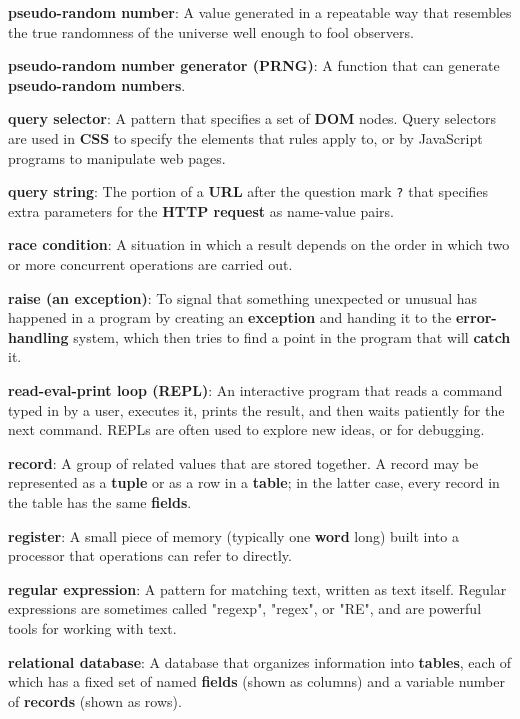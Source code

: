 \documentclass[krantzl]{krantz}
\newcommand{\glosskey}[1]{\textbf{#1}}
\begin{document}
\noindent \textbf{\glosskey{pseudo-random number}}: 
A value generated in a repeatable way that resembles the true randomness of the universe well enough to fool observers.


\noindent \textbf{\glosskey{pseudo-random number generator} (PRNG)}: 
A function that can generate \glosskey{pseudo-random numbers}.


\noindent \textbf{\glosskey{query selector}}: 
A pattern that specifies a set of \glosskey{DOM} nodes.  Query selectors are used in \glosskey{CSS} to specify the elements that rules apply to, or by JavaScript programs to manipulate web pages.


\noindent \textbf{\glosskey{query string}}: 
The portion of a \glosskey{URL} after the question mark \texttt{?} that specifies extra parameters for the \glosskey{HTTP request} as name-value pairs.


\noindent \textbf{\glosskey{race condition}}: 
A situation in which a result depends on the order in which two or more concurrent operations are carried out.


\noindent \textbf{\glosskey{raise (an exception)}}: 
To signal that something unexpected or unusual has happened in a program by creating an \glosskey{exception} and handing it to the \glosskey{error-handling} system, which then tries to find a point in the program that will \glosskey{catch} it.


\noindent \textbf{\glosskey{read-eval-print loop} (REPL)}: 
An interactive program that reads a command typed in by a user, executes it, prints the result, and then waits patiently for the next command. REPLs are often used to explore new ideas, or for debugging.


\noindent \textbf{\glosskey{record}}: 
A group of related values that are stored together. A record may be represented as a \glosskey{tuple} or as a row in a \glosskey{table}; in the latter case, every record in the table has the same \glosskey{fields}.


\noindent \textbf{\glosskey{register}}: 
A small piece of memory (typically one \glosskey{word} long) built into a processor that operations can refer to directly.


\noindent \textbf{\glosskey{regular expression}}: 
A pattern for matching text, written as text itself. Regular expressions are sometimes called "regexp", "regex", or "RE", and are powerful tools for working with text.


\noindent \textbf{\glosskey{relational database}}: 
A database that organizes information into \glosskey{tables}, each of which has a fixed set of named \glosskey{fields} (shown as columns) and a variable number of \glosskey{records} (shown as rows).
\end{document}
